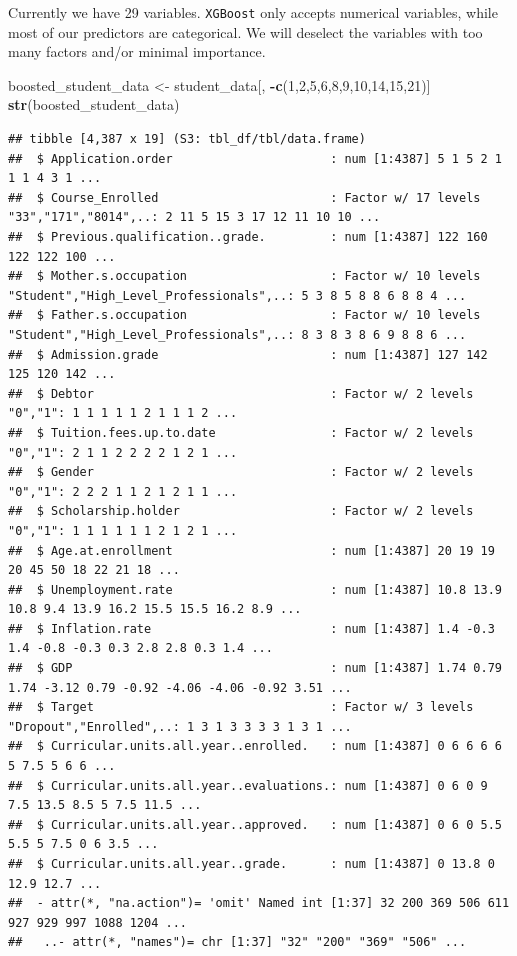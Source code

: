 \documentclass[
]{article}
\newenvironment{Shaded}{\begin{snugshade}}{\end{snugshade}}
\newcommand{\DecValTok}[1]{\textcolor[rgb]{0.00,0.00,0.81}{#1}}
\newcommand{\FunctionTok}[1]{\textcolor[rgb]{0.13,0.29,0.53}{\textbf{#1}}}
\newcommand{\NormalTok}[1]{#1}
\newcommand{\OtherTok}[1]{\textcolor[rgb]{0.56,0.35,0.01}{#1}}
\newcommand{\SpecialCharTok}[1]{\textcolor[rgb]{0.81,0.36,0.00}{\textbf{#1}}}
\begin{document}
Currently we have 29 variables. \texttt{XGBoost} only accepts numerical
variables, while most of our predictors are categorical. We will
deselect the variables with too many factors and/or minimal importance.

\begin{Shaded}
\begin{Highlighting}[]
\NormalTok{boosted\_student\_data }\OtherTok{\textless{}{-}}\NormalTok{ student\_data[, }\SpecialCharTok{{-}}\FunctionTok{c}\NormalTok{(}\DecValTok{1}\NormalTok{,}\DecValTok{2}\NormalTok{,}\DecValTok{5}\NormalTok{,}\DecValTok{6}\NormalTok{,}\DecValTok{8}\NormalTok{,}\DecValTok{9}\NormalTok{,}\DecValTok{10}\NormalTok{,}\DecValTok{14}\NormalTok{,}\DecValTok{15}\NormalTok{,}\DecValTok{21}\NormalTok{)]}
\FunctionTok{str}\NormalTok{(boosted\_student\_data)}
\end{Highlighting}
\end{Shaded}

\begin{verbatim}
## tibble [4,387 x 19] (S3: tbl_df/tbl/data.frame)
##  $ Application.order                      : num [1:4387] 5 1 5 2 1 1 1 4 3 1 ...
##  $ Course_Enrolled                        : Factor w/ 17 levels "33","171","8014",..: 2 11 5 15 3 17 12 11 10 10 ...
##  $ Previous.qualification..grade.         : num [1:4387] 122 160 122 122 100 ...
##  $ Mother.s.occupation                    : Factor w/ 10 levels "Student","High_Level_Professionals",..: 5 3 8 5 8 8 6 8 8 4 ...
##  $ Father.s.occupation                    : Factor w/ 10 levels "Student","High_Level_Professionals",..: 8 3 8 3 8 6 9 8 8 6 ...
##  $ Admission.grade                        : num [1:4387] 127 142 125 120 142 ...
##  $ Debtor                                 : Factor w/ 2 levels "0","1": 1 1 1 1 1 2 1 1 1 2 ...
##  $ Tuition.fees.up.to.date                : Factor w/ 2 levels "0","1": 2 1 1 2 2 2 2 1 2 1 ...
##  $ Gender                                 : Factor w/ 2 levels "0","1": 2 2 2 1 1 2 1 2 1 1 ...
##  $ Scholarship.holder                     : Factor w/ 2 levels "0","1": 1 1 1 1 1 1 2 1 2 1 ...
##  $ Age.at.enrollment                      : num [1:4387] 20 19 19 20 45 50 18 22 21 18 ...
##  $ Unemployment.rate                      : num [1:4387] 10.8 13.9 10.8 9.4 13.9 16.2 15.5 15.5 16.2 8.9 ...
##  $ Inflation.rate                         : num [1:4387] 1.4 -0.3 1.4 -0.8 -0.3 0.3 2.8 2.8 0.3 1.4 ...
##  $ GDP                                    : num [1:4387] 1.74 0.79 1.74 -3.12 0.79 -0.92 -4.06 -4.06 -0.92 3.51 ...
##  $ Target                                 : Factor w/ 3 levels "Dropout","Enrolled",..: 1 3 1 3 3 3 3 1 3 1 ...
##  $ Curricular.units.all.year..enrolled.   : num [1:4387] 0 6 6 6 6 5 7.5 5 6 6 ...
##  $ Curricular.units.all.year..evaluations.: num [1:4387] 0 6 0 9 7.5 13.5 8.5 5 7.5 11.5 ...
##  $ Curricular.units.all.year..approved.   : num [1:4387] 0 6 0 5.5 5.5 5 7.5 0 6 3.5 ...
##  $ Curricular.units.all.year..grade.      : num [1:4387] 0 13.8 0 12.9 12.7 ...
##  - attr(*, "na.action")= 'omit' Named int [1:37] 32 200 369 506 611 927 929 997 1088 1204 ...
##   ..- attr(*, "names")= chr [1:37] "32" "200" "369" "506" ...
\end{verbatim}
\end{document}
